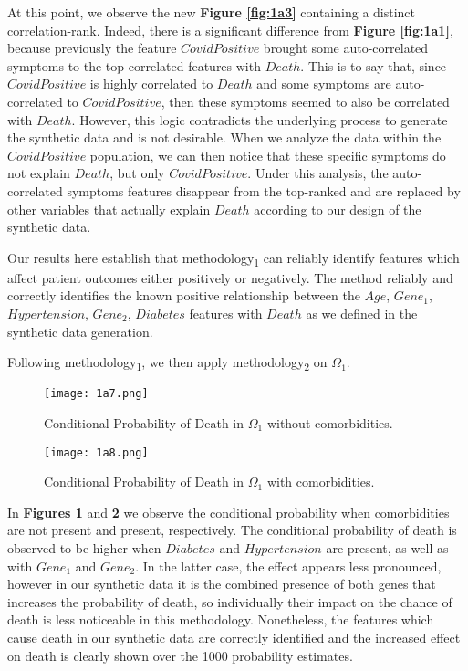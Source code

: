 At this point, we observe the new \textbf{Figure \ref{fig:1a3}} containing a distinct correlation-rank. Indeed, there is a significant difference from \textbf{Figure \ref{fig:1a1}}, because previously the feature $CovidPositive$ brought some auto-correlated symptoms to the top-correlated features with $Death$. This is to say that, since $CovidPositive$ is highly correlated to $Death$ and some symptoms are auto-correlated to $CovidPositive$, then these symptoms seemed to also be correlated with $Death$. However, this logic contradicts the underlying process to generate the synthetic data and is not desirable. When we analyze the data within the $CovidPositive$ population, we can then notice that these specific symptoms do not explain $Death$, but only $CovidPositive$. Under this analysis, the auto-correlated symptoms features disappear from the top-ranked and are replaced by other variables that actually explain $Death$ according to our design of the synthetic data.

Our results here establish that methodology\textsubscript{1} can reliably identify features which affect patient outcomes either positively or negatively. The method reliably and correctly identifies the known positive relationship between the $Age$, $Gene_1$, $Hypertension$, $Gene_2$, $Diabetes$ features with $Death$ as we defined in the synthetic data generation.

Following methodology\textsubscript{1}, we then apply methodology\textsubscript{2} on $\Omega_1$. 

\begin{figure}[H]
  \texttt{[image: 1a7.png]}
  \caption{Conditional Probability of Death in $\Omega_1$ without comorbidities.}
  \label{fig:1a7}
\end{figure}

\begin{figure}[H]
  \texttt{[image: 1a8.png]}
  \caption{Conditional Probability of Death in $\Omega_1$ with comorbidities.}
  \label{fig:1a8}
\end{figure}

In \textbf{Figures \ref{fig:1a7}} and \textbf{\ref{fig:1a8}} we observe the conditional probability when comorbidities are not present and present, respectively. The conditional probability of death is observed to be higher when $Diabetes$ and $Hypertension$ are present, as well as with $Gene_1$ and $Gene_2$. In the latter case, the effect appears less pronounced, however in our synthetic data it is the combined presence of both genes that increases the probability of death, so individually their impact on the chance of death is less noticeable in this methodology. Nonetheless, the features which cause death in our synthetic data are correctly identified and the increased effect on death is clearly shown over the 1000 probability estimates.

